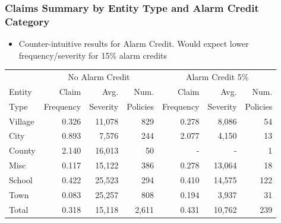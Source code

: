 \documentclass[serif,10pt]{beamer}
\begin{document}
\begin{frame}
\frametitle{Claims Summary by Entity Type and Alarm Credit Category}
  \begin{itemize}
\item Counter-intuitive results for Alarm Credit. Would expect lower frequency/severity for 15\% alarm
credits \vspace{2mm}
\end{itemize}
\begin{table}[htbp]
  \centering
    \begin{tabular}{l | rrr | rrr }
    \hline \hline
   & \multicolumn{3}{c|}{No Alarm Credit} & \multicolumn{3}{c}{Alarm Credit 5\%}  \\
    Entity & Claim & Avg.  & Num. & Claim & Avg.  & Num. \\
    Type  & Frequency & Severity & Policies  & Frequency & Severity  &  Policies\\
    \hline
    Village &   0.326  &   11,078  &      829  &   0.278  &    8,086  &         54  \\
    City    &   0.893  &    7,576  &      244  &   2.077  &    4,150  &         13  \\
    County  &   2.140  &   16,013  &       50  &          -    &  -   &           1  \\
    Misc    &   0.117  &   15,122  &      386  &   0.278  &   13,064  &         18  \\
    School  &   0.422  &   25,523  &      294  &   0.410  &   14,575  &      122  \\
    Town    &   0.083  &   25,257  &      808  &   0.194  &    3,937  &         31  \\
    \hline
    Total   &   0.318  &   15,118  &   2,611  &   0.431  &    10,762  &      239  \\
    \hline
\end{tabular}

    \bigskip


\end{table}
\end{frame}
\end{document}
